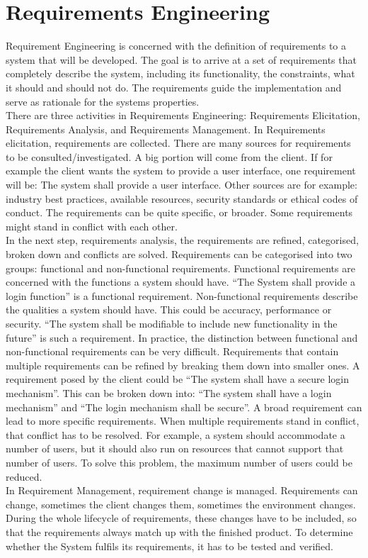\section{Requirements Engineering}
Requirement Engineering is concerned with the definition of requirements to a system that will be developed. The goal is to arrive at a set of requirements that completely describe the system, including its functionality, the constraints, what it should and should not do. The requirements guide the implementation and serve as rationale for the systems properties.\cite{de2010requirements:1}\\
There are three activities in Requirements Engineering: Requirements Elicitation, Requirements Analysis, and Requirements Management. In Requirements elicitation, requirements are collected. There are many sources for requirements to be consulted/investigated. A big portion will come from the client. If for example the client wants the system to provide a user interface, one requirement will be: The system shall provide a user interface. Other sources are for example: industry best practices, available resources, security standards or ethical codes of conduct. The requirements can be quite specific, or broader. Some requirements might stand in conflict with each other.\\
In the next step, requirements analysis, the requirements are refined, categorised, broken down and conflicts are solved. Requirements can be categorised into two groups: functional and non-functional requirements. Functional requirements are concerned with the functions a system should have. “The System shall provide a login function” is a functional requirement. Non-functional requirements describe the qualities a system should have. This could be accuracy, performance or security. “The system shall be modifiable to include new functionality in the future” is such a requirement. In practice, the distinction between functional and non-functional requirements can be very difficult. Requirements that contain multiple requirements can be refined by breaking them down into smaller ones. \cite{van2001goal:2}A requirement posed by the client could be “The system shall have a secure login mechanism”. This can be broken down into: “The system shall have a login mechanism” and “The login mechanism shall be secure”. A broad requirement can lead to more specific requirements. When multiple requirements stand in conflict, that conflict has to be resolved.\cite{van2001goal:2} For example, a system should accommodate a number of users, but it should also run on resources that cannot support that number of users. To solve this problem, the maximum number of users could be reduced.\\
In Requirement Management, requirement change is managed. Requirements can change, sometimes the client changes them, sometimes the environment changes. During the whole lifecycle of requirements, these changes have to be included, so that the requirements always match up with the finished product. To determine whether the System fulfils its requirements, it has to be tested and verified.

